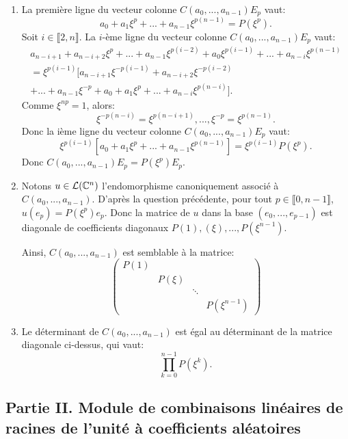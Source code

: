 \begin{enumerate}
\item La première ligne du vecteur colonne $C(a_{0}, ..., a_{n-1})E_{p}$ vaut:
\[ a_{0} + a_{1}\xi^{p} + ... + a_{n-1}\xi^{p(n-1)} = P(\xi^{p}).\]
Soit $i\in \llbracket 2, n\rrbracket$. La $i$-ème ligne du vecteur colonne $C(a_{0}, ..., a_{n-1})E_{p}$ vaut:
\begin{multline*}
 a_{n-i+1} + a_{n-i+2}\xi^{p} + ... + a_{n-1}\xi^{p(i-2)} + a_{0}\xi^{p(i-1)} + ... + a_{n-i}\xi^{p(n-1)} \\
  = \xi^{p(i-1)}[a_{n-i+1}\xi^{-p(i-1)} + a_{n-i+2}\xi^{-p(i-2)} \\
    + ... + a_{n-1}\xi^{-p} + a_{0} + a_{1}\xi^{p} + ... + a_{n-i}\xi^{p(n-i)}].
\end{multline*}
Comme $\xi^{np} = 1$, alors:
\[ \xi^{-p(n-i)} = \xi^{p(n-i+1)}, ..., \xi^{-p} = \xi^{p(n-1)}.\]
Donc la ième ligne du vecteur colonne $C(a_{0}, ..., a_{n-1})E_{p}$ vaut:
\[ \xi^{p(i-1)}[a_{0} + a_{1}\xi^{p} + ... + a_{n-1}\xi^{p(n-1)}] = \xi^{p(i-1)}P(\xi^{p}).\]
Donc $C(a_{0}, ..., a_{n-1})E_{p} = P(\xi^{p})E_{p}$.

\item Notons $u\in \mathcal{L}(\mathbb{C}^{n})$ l'endomorphisme canoniquement associé à $C(a_{0}, ..., a_{n-1})$. D'après la question précédente, pour tout $p\in \llbracket 0, n-1\rrbracket$, $u(e_{p}) = P(\xi^{p})e_{p}$. Donc la matrice de $u$ dans la base $(e_{0}, ..., e_{p-1})$ est diagonale de coefficients diagonaux $P(1), (\xi), ..., P(\xi^{n-1})$. 

Ainsi, $C(a_{0}, ..., a_{n-1})$ est semblable à la matrice:
\[ \begin{pmatrix}
    P(1) \\
    & P(\xi) \\
    & & \ddots \\
    & & & P(\xi^{n-1})
    \end{pmatrix}\]
    
\item Le déterminant de $C(a_{0}, ..., a_{n-1})$ est égal au déterminant de la matrice diagonale ci-dessus, qui vaut:
\[ \prod_{k=0}^{n-1}P(\xi^{k}).\]



\end{enumerate}




\subsection*{Partie II. Module de combinaisons linéaires de racines de l'unité à coefficients aléatoires}

